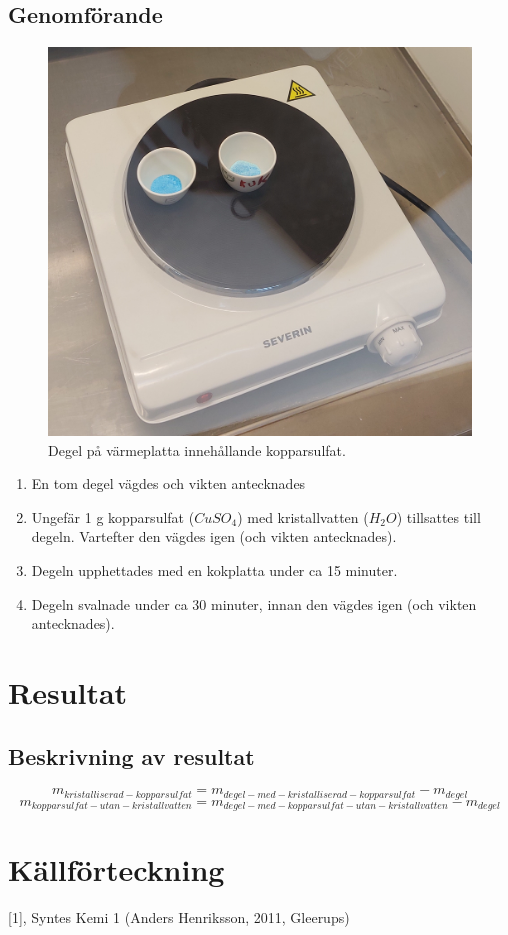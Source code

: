 \documentclass{article}
\begin{document}
	\subsection{Genomförande}
	\begin{figure}
		\includegraphics[width=0.9\linewidth]{plattdegel}
		\caption{Degel på värmeplatta innehållande kopparsulfat.}
		\label{fig:wrapfig}
	\end{figure}
	\begin{enumerate}
		\item En tom degel vägdes och vikten antecknades
		\item Ungefär 1 g kopparsulfat ($CuSO_4$) med kristallvatten ($H_2O$) tillsattes till degeln. Vartefter den vägdes igen (och vikten antecknades).
		\item Degeln upphettades med en kokplatta under ca 15 minuter.
		\item Degeln svalnade under ca 30 minuter, innan den vägdes igen (och vikten antecknades). 
	\end{enumerate}

	\section{Resultat}
	\subsection{Beskrivning av resultat}
	\[m_{kristalliserad-kopparsulfat}=m_{degel-med-kristalliserad-kopparsulfat}-m_{degel}\]
	\[m_{kopparsulfat-utan-kristallvatten}=m_{degel-med-kopparsulfat-utan-kristallvatten}-m_{degel}\]
	
	\pagebreak
	\section{Källförteckning}
	[1], Syntes Kemi 1 (Anders Henriksson, 2011, Gleerups) 
	\newline[ISBN: 978-91-40-67418-0]
	\newline
	
	
	
\end{document}
